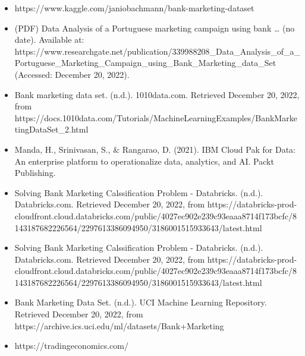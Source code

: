 \documentclass[
  letterpaper,
  DIV=11,
  numbers=noendperiod]{scrartcl}
\begin{document}
\begin{itemize}
\item
  https://www.kaggle.com/janiobachmann/bank-marketing-dataset
\item
  (PDF) Data Analysis of a Portuguese marketing campaign using bank
  \ldots{} (no date). Available at:
  https://www.researchgate.net/publication/339988208\_Data\_Analysis\_of\_a\_Portuguese\_Marketing\_Campaign\_using\_Bank\_Marketing\_data\_Set
  (Accessed: December 20, 2022).
\item
  Bank marketing data set. (n.d.). 1010data.com. Retrieved December 20,
  2022, from
  https://docs.1010data.com/Tutorials/MachineLearningExamples/BankMarketingDataSet\_2.html
\item
  Manda, H., Srinivasan, S., \& Rangarao, D. (2021). IBM Cloud Pak for
  Data: An enterprise platform to operationalize data, analytics, and
  AI. Packt Publishing.
\item
  Solving Bank Marketing Calssification Problem - Databricks. (n.d.).
  Databricks.com. Retrieved December 20, 2022, from
  https://databricks-prod-cloudfront.cloud.databricks.com/public/4027ec902e239c93eaaa8714f173bcfc/8143187682226564/2297613386094950/3186001515933643/latest.html
\item
  Solving Bank Marketing Calssification Problem - Databricks. (n.d.).
  Databricks.com. Retrieved December 20, 2022, from
  https://databricks-prod-cloudfront.cloud.databricks.com/public/4027ec902e239c93eaaa8714f173bcfc/8143187682226564/2297613386094950/3186001515933643/latest.html
\item
  Bank Marketing Data Set. (n.d.). UCI Machine Learning Repository.
  Retrieved December 20, 2022, from
  https://archive.ics.uci.edu/ml/datasets/Bank+Marketing
\item
  https://tradingeconomics.com/
\end{itemize}
\end{document}
